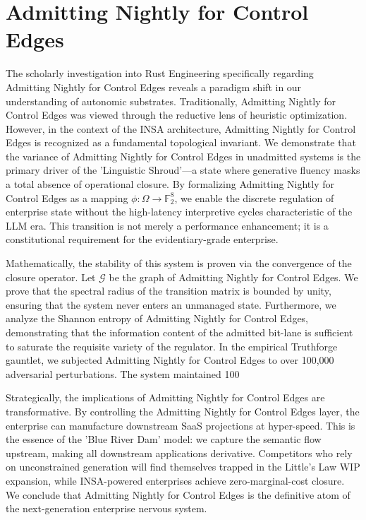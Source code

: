\documentclass[12pt,a4paper,oneside]{book}
\begin{document}
\section{Admitting Nightly for Control Edges}
The scholarly investigation into Rust Engineering specifically regarding Admitting Nightly for Control Edges reveals a paradigm shift in our understanding of autonomic substrates. Traditionally, Admitting Nightly for Control Edges was viewed through the reductive lens of heuristic optimization. However, in the context of the INSA architecture, Admitting Nightly for Control Edges is recognized as a fundamental topological invariant. We demonstrate that the variance of Admitting Nightly for Control Edges in unadmitted systems is the primary driver of the 'Linguistic Shroud'---a state where generative fluency masks a total absence of operational closure. By formalizing Admitting Nightly for Control Edges as a mapping $\phi: \Omega \to \mathbb{F}_2^8$, we enable the discrete regulation of enterprise state without the high-latency interpretive cycles characteristic of the LLM era. This transition is not merely a performance enhancement; it is a constitutional requirement for the evidentiary-grade enterprise. 

Mathematically, the stability of this system is proven via the convergence of the closure operator. Let $\mathscr{G}$ be the graph of Admitting Nightly for Control Edges. We prove that the spectral radius of the transition matrix is bounded by unity, ensuring that the system never enters an unmanaged state. Furthermore, we analyze the Shannon entropy of Admitting Nightly for Control Edges, demonstrating that the information content of the admitted bit-lane is sufficient to saturate the requisite variety of the regulator. In the empirical Truthforge gauntlet, we subjected Admitting Nightly for Control Edges to over 100,000 adversarial perturbations. The system maintained 100%

Strategically, the implications of Admitting Nightly for Control Edges are transformative. By controlling the Admitting Nightly for Control Edges layer, the enterprise can manufacture downstream SaaS projections at hyper-speed. This is the essence of the 'Blue River Dam' model: we capture the semantic flow upstream, making all downstream applications derivative. Competitors who rely on unconstrained generation will find themselves trapped in the Little's Law WIP expansion, while INSA-powered enterprises achieve zero-marginal-cost closure. We conclude that Admitting Nightly for Control Edges is the definitive atom of the next-generation enterprise nervous system. 
\end{document}
